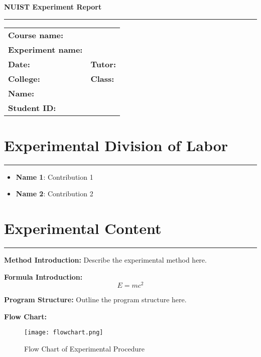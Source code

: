 \documentclass{article}
\newcommand{\sectionline}{%
  \noindent\textcolor{gray}{\rule{\textwidth}{0.5pt}}\par\vspace{1em}
}
\begin{document}
\begin{center}
    {\LARGE \textbf{NUIST Experiment Report}}
\end{center}
\sectionline %

\vspace{1em}

\large %
\begin{tabularx}{\textwidth}{>{\raggedright\arraybackslash}X l}
    \textbf{Course name:} & \\[1em]
    \textbf{Experiment name:} & \\[1em]
    \textbf{Date:} & \hspace{4em} \textbf{Tutor:} \\[1em]
    \textbf{College:} & \hspace{4em} \textbf{Class:} \\[1em]
    \textbf{Name:} & \\[1em]
    \textbf{Student ID:} & \\
\end{tabularx}
\normalsize %

\vspace{1em}

\section{Experimental Division of Labor}
\sectionline %
\begin{itemize}[leftmargin=*, labelsep=1em]
    \item \textbf{Name 1}: Contribution 1
    \item \textbf{Name 2}: Contribution 2
\end{itemize}

\section{Experimental Content}
\sectionline %
\textbf{Method Introduction:} Describe the experimental method here.

\textbf{Formula Introduction:}
\begin{equation}
    E = mc^2
\end{equation}

\textbf{Program Structure:} Outline the program structure here.

\textbf{Flow Chart:}
\begin{figure}[H]
    \centering
    \texttt{[image: flowchart.png]}
    \caption{Flow Chart of Experimental Procedure}
\end{figure}
\end{document}
